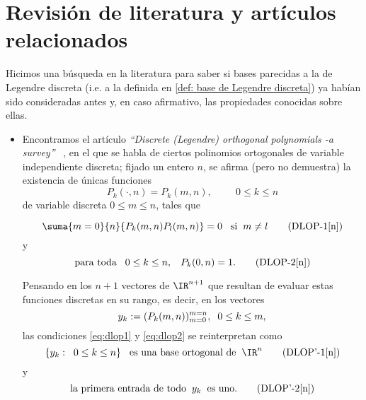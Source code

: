 \section{Revisión de literatura y artículos relacionados}

Hicimos una búsqueda en la literatura
para saber si bases parecidas a la
de Legendre discreta
(i.e. a la definida en 
\ref{def: base de Legendre discreta})
ya habían sido 
consideradas antes y, en caso afirmativo, las propiedades
conocidas sobre ellas. 


\begin{itemize}
\item Encontramos el artículo \textit{``Discrete (Legendre) 
orthogonal polynomials -a survey''} ~\cite{Neuman}, en el que se habla de
ciertos polinomios ortogonales de variable independiente
discreta; fijado un entero $n$,
se afirma (pero no demuestra) la existencia de únicas funciones
\[
P_{k}(\cdot ,n)=P_{k}(m,n), \hspace{1cm} 0 \leq k \leq n
\]
de variable discreta $0 \leq m \leq n $, tales que


\begin{equation}
\suma{m=0}{n}{P_{k}(m,n) P_{l}(m,n)} =0
\hspace{0.3cm} \text{si} \hspace{0.2cm} m \neq l \tag{DLOP-1[n]} \label{eq:dlop1}
\end{equation}
y 
\begin{equation}
\text{para toda} \hspace{0.3cm} 0 \leq k \leq n, \hspace{0.3cm} P_{k}(0, n)=1.   \tag{DLOP-2[n]} \label{eq:dlop2}
\end{equation}


Pensando en los 
$n+1$ vectores de $\IR^{n+1}$ que resultan
de evaluar estas funciones discretas en su rango,
es decir, en los vectores
\begin{equation}
y_{k}:= (P_{k}(m, n))_{m=0}^{m=n}, \hspace{0.2cm}
0 \leq k \leq m,
\end{equation}
las condiciones \eqref{eq:dlop1} y \eqref{eq:dlop2}
se reinterpretan como
\begin{equation}
\{ y_{k}: \hspace{0.2cm} 0 \leq k \leq n\}
\hspace{0.3cm} \text{es una
base ortogonal de} \hspace{0.2cm} \IR^{n}
\tag{DLOP'-1[n]} \label{eq:dlop'1}
\end{equation}
y 
\begin{equation}
\text{la primera
entrada de todo} \hspace{0.2cm} y_{k} \hspace{0.2cm}
\text{es uno.} 
\tag{DLOP'-2[n]} \label{eq:dlop'2}
\end{equation}



\end{itemize}
